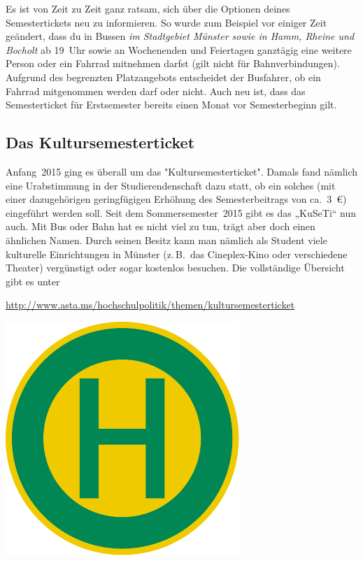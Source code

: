 \begin{multicols*}{2}
Es ist von Zeit zu Zeit ganz ratsam, sich über die Optionen deines Semestertickets neu zu informieren.
So wurde zum Beispiel vor einiger Zeit geändert, dass du in Bussen \emph{im Stadtgebiet Münster sowie in Hamm, Rheine und Bocholt} ab 19~Uhr sowie an Wochenenden und Feiertagen ganztägig eine weitere Person oder ein Fahrrad mitnehmen darfst (gilt nicht für Bahnverbindungen).
Aufgrund des begrenzten Platzangebots entscheidet der Busfahrer, ob ein Fahrrad mitgenommen werden darf oder nicht.
Auch neu ist, dass das Semesterticket für Erstsemester bereits einen Monat vor Semesterbeginn gilt.

\subsection{Das Kultursemesterticket}
Anfang~2015 ging es überall um das "Kultursemesterticket".
Damals fand nämlich eine Urabstimmung in der Studierendenschaft dazu statt, ob ein solches (mit einer dazugehörigen geringfügigen Erhöhung des Semesterbeitrags von ca.\ \SI{3}{\euro}) eingeführt werden soll.
Seit dem Sommersemester~2015 gibt es das „KuSeTi“ nun auch.
Mit Bus oder Bahn hat es nicht viel zu tun, trägt aber doch einen ähnlichen Namen.
Durch seinen Besitz kann man nämlich als Student viele kulturelle Einrichtungen in Münster (z.\,B.\ das Cineplex-Kino oder verschiedene Theater) vergünstigt oder sogar kostenlos besuchen.
Die vollständige Übersicht gibt es unter
\begin{center}
	\url{http://www.asta.ms/hochschulpolitik/themen/kultursemesterticket}
\end{center}

\smallskip

\begin{center}
	\includegraphics[width=\columnwidth, height=0.16\textheight]{res/bushaltestelle.pdf}


\end{center}
\end{multicols*}

